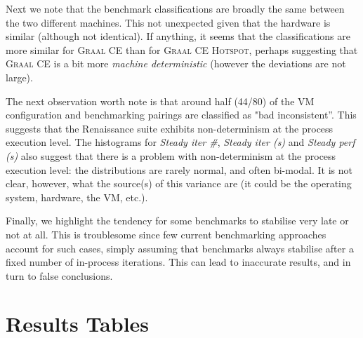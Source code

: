 \documentclass[a4paper]{article}
\newcommand{\graalce}{\textsc{Graal CE}\xspace}
\newcommand{\graalcehs}{\textsc{Graal CE Hotspot}\xspace}
\newcommand{\jnine}{\textsc{OpenJ9}\xspace}
\newcommand{\bencherseven}{Linux$_\mathrm{1240v5}$\xspace}
\newcommand{\bencherten}{Linux$_\mathrm{1240v6}$\xspace}
\begin{document}
Next we note that the benchmark classifications are broadly the same between
the two different machines. This not unexpected given that the hardware is
similar (although not identical). If anything, it seems that the
classifications are more similar for \graalce than for \graalcehs, perhaps
suggesting that \graalce is a bit more \emph{machine deterministic} (however
the deviations are not large).

The next observation worth note is that around half (44/80) of the VM
configuration and benchmarking pairings are classified as "bad inconsistent''.
This suggests that the Renaissance suite exhibits non-determinism at the
process execution level. The histograms for \emph{Steady iter \#}, \emph{Steady
iter (s)} and \emph{Steady perf (s)} also suggest that there is a problem with
non-determinism at the process execution level: the distributions are rarely
normal, and often bi-modal. It is not clear, however, what the source(s) of
this variance are (it could be the operating system, hardware, the VM, etc.).

Finally, we highlight the tendency for some benchmarks to stabilise very late
or not at all. This is troublesome since few current benchmarking approaches
account for such cases, simply assuming that benchmarks always stabilise after
a fixed number of in-process iterations. This can lead to inaccurate results,
and in turn to false conclusions.




\appendix

\section{Results Tables}


\newcommand{\captionbsevengraalce}{Results for \graalce on \bencherseven.}


\newpage
\newcommand{\captionbsevengraalcehs}{Results for \graalcehs on \bencherseven.}


\newpage
\newcommand{\captionbsevenjnine}{Results for \jnine on \bencherseven.}


\newpage
\newcommand{\captionbtengraalce}{Results for \graalce on \bencherten.}


\newpage
\newcommand{\captionbtengraalcehs}{Results for \graalcehs on \bencherten.}

\end{document}
